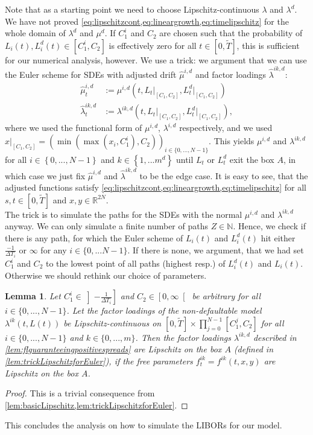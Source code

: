 \documentclass[12pt]{article}
\newtheorem{lemma}[theorem]{Lemma}
\begin{document}
	Note that as a starting point we need to choose Lipschitz-continuous $\lambda$ and $\lambda^d$.\\
	We have not proved \cref{eq:lipschitzcont,eq:lineargrowth,eq:timelipschitz} for the whole domain of $\lambda^d$ and $\mu^d$. If $C^i_1$ and $C_2$ are chosen such that the probability of $L_i(t), L^d_i(t)\in \left[C^i_1, C_2\right]$ is effectively zero for all $t\in \left[0,\tilde{T}\right]$, this is sufficient for our numerical analysis, however. We use a trick: we argument that we can use the Euler scheme for SDEs with adjusted drift $\hat{\mu}^{i,d}$ and factor loadings $\hat{\lambda}^{i k, d}$:
	\begin{align*}
		\hat{\mu}^{i,d}_t &:= \mu^{i,d}\left(t, L_t\big|_{\left[C_1,C_2\right]}, L^d_t\big|_{\left[C_1,C_2\right]} \right)\\
		\hat{\lambda}^{i k, d}_t &:= \lambda^{i k,d}\left(t,  L_t\big|_{\left[C_1,C_2\right]}, L^d_t\big|_{\left[C_1,C_2\right]}\right),
	\end{align*}
	where we used the functional form of $\mu^{i,d}$, $\lambda^{i,d}$ respectively, and we used $x\big|_{\left[C_1,C_2\right]} = \left(\min\left(\max\left(x_i, C^i_1\right), C_2\right)\right)_{i\in\{0,...,N-1\}}$. This yields $\mu^{i,d}$ and $\lambda^{i k,d}$ for all $i \in \left\{0,...,N-1\right\}$ and $k\in\left\{1,...m^d\right\}$ until $L_t$ or $L^d_t$ exit the box $A$, in which case we just fix $\hat{\mu}^{i,d}$ and $\hat{\lambda}^{i k,d}$ to be the edge case. It is easy to see, that the adjusted functions satisfy \cref{eq:lipschitzcont,eq:lineargrowth,eq:timelipschitz} for all $s,t\in\left[0,\tilde{T}\right]$ and $x,y\in\mathbb{R}^{2N}$.\\
	The trick is to simulate the paths for the SDEs with the normal $\mu^{i,d}$ and $\lambda^{i k,d}$ anyway. We can only simulate a finite number of paths $Z\in\mathbb{N}$. Hence, we check if there is any path, for which the Euler scheme of $L_i(t)$ and $L^d_i(t)$ hit either $\frac{-1}{\Delta T_i}$ or $\infty$ for any $i\in\{0,...N-1\}$. If there is none, we argument, that we had set $C^i_1$ and $C_2$ to the lowest point of all paths (highest resp.) of $L^d_i(t)$ and $L_i(t)$. Otherwise we should rethink our choice of parameters.
	\begin{lemma}
		Let $C^i_1\in\left]-\frac{1}{\Delta T_i}\right]$ and $C_2\in \left[0, \infty\right[$ be arbitrary for all $i \in \{0,...,N-1\}$. Let the factor loadings of the non-defaultable model $\lambda^{i k}(t,L(t))$ be Lipschitz-continuous on $\left[0,\tilde{T}\right]\times\prod_{j=0}^{N-1}\left[C^j_1,C_2\right]$ for all $i \in \{0,...,N-1\}$ and $k \in \{0,...,m\}$.
		Then the factor loadings $\lambda^{i k, d}$ described in \cref{lem:flguaranteeingpositivespreads} are Lipschitz on the box $A$ (defined in \cref{lem:trickLipschitzforEuler}), if the free parameters $f^{i k}_t=f^{i k}(t,x,y)$ are Lipschitz on the box $A$.
	\end{lemma}
	\begin{proof}
		This is a trivial consequence from \cref{lem:basicLipschitz,lem:trickLipschitzforEuler}.
	\end{proof}
	This concludes the analysis on how to simulate the LIBORs for our model.
	
\end{document}
